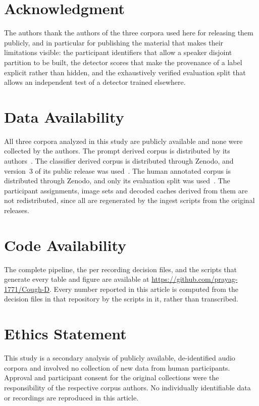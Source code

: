 \section*{Acknowledgment}

The authors thank the authors of the three corpora used here for releasing them publicly,
and in particular for publishing the material that makes their limitations visible: the
participant identifiers that allow a speaker disjoint partition to be built, the detector
scores that make the provenance of a label explicit rather than hidden, and the
exhaustively verified evaluation split that allows an independent test of a detector
trained elsewhere.

\section*{Data Availability}

All three corpora analyzed in this study are publicly available and none were collected by
the authors. The prompt derived corpus is distributed by its authors~\cite{coswara2020}.
The classifier derived corpus is distributed through Zenodo, and version~3 of its public
release was used~\cite{coughvid2021}. The human annotated corpus is distributed through
Zenodo, and only its evaluation split was used~\cite{fsd50k2022}. The participant
assignments, image sets and decoded caches derived from them are not redistributed, since
all are regenerated by the ingest scripts from the original releases.

\section*{Code Availability}

The complete pipeline, the per recording decision files, and the scripts that generate
every table and figure are available at
\url{https://github.com/prayag-1771/Cough-D}. Every number reported in this article is
computed from the decision files in that repository by the scripts in it, rather than
transcribed.

\section*{Ethics Statement}

This study is a secondary analysis of publicly available, de-identified audio corpora and
involved no collection of new data from human participants. Approval and participant
consent for the original collections were the responsibility of the respective corpus
authors. No individually identifiable data or recordings are reproduced in this article.

